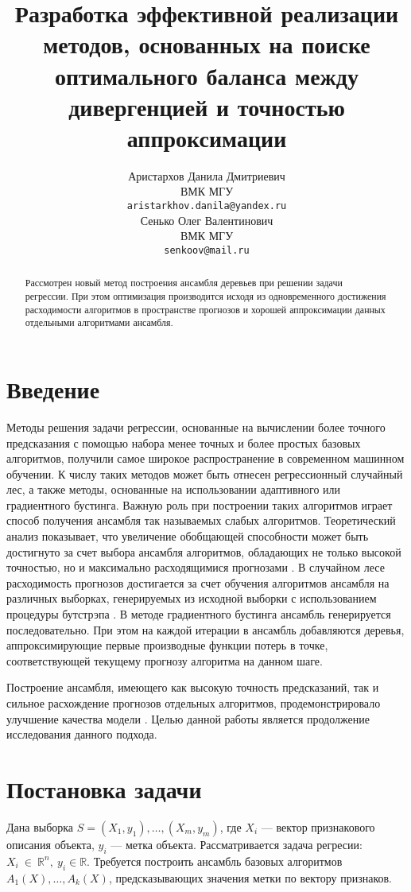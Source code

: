 \documentclass{article}
\title{Разработка эффективной реализации методов, основанных на поиске оптимального баланса между дивергенцией и точностью аппроксимации}
\author{ Аристархов Данила Дмитриевич \\
	ВМК МГУ \\
	\texttt{aristarkhov.danila@yandex.ru} \\
	\And
	Сенько Олег Валентинович \\
	ВМК МГУ \\
	\texttt{senkoov@mail.ru} \\
}
\date{}
\begin{document}
\maketitle

\begin{abstract}
	Рассмотрен новый метод построения ансамбля деревьев при решении задачи регрессии. При этом оптимизация производится исходя из одновременного достижения расходимости алгоритмов в пространстве прогнозов и хорошей аппроксимации данных отдельными алгоритмами ансамбля. 
\end{abstract}



\section{Введение}

Методы решения задачи регрессии, основанные на вычислении более точного предсказания с помощью набора менее точных и более простых базовых алгоритмов, получили самое широкое распространение в современном машинном обучении. К числу таких методов может быть отнесен регрессионный случайный лес, а также методы, основанные на использовании адаптивного или градиентного бустинга. Важную роль при построении таких алгоритмов играет способ получения ансамбля так называемых слабых алгоритмов. Теоретический анализ показывает, что увеличение обобщающей способности может быть достигнуто за счет выбора ансамбля алгоритмов, обладающих не только высокой точностью, но и максимально расходящимися прогнозами \citep{convex}. В случайном лесе расходимость прогнозов достигается за счет обучения алгоритмов ансамбля на различных выборках, генерируемых из исходной выборки с использованием процедуры бутстрэпа \citep{bagging}. В методе градиентного бустинга \citep{boosting} ансамбль генерируется последовательно. При этом на каждой итерации в ансамбль добавляются деревья, аппроксимирующие первые производные функции потерь в точке, соответствующей текущему прогнозу алгоритма на данном шаге.

Построение ансамбля, имеющего как высокую точность предсказаний, так и сильное расхождение прогнозов отдельных алгоритмов, продемонстрировало улучшение качества модели \citep{twolevel}. Целью данной работы является продолжение исследования данного подхода.

\section{Постановка задачи}
Дана выборка $S={(X_1, y_1), \dots, (X_m, y_m)}$, где $X_i$ --- вектор признакового описания объекта, $y_i$ --- метка объекта. Рассматривается задача регресии: $X_i~\in~\mathbb{R}^n, \  y_i \in \mathbb{R}$. Требуется построить ансамбль базовых алгоритмов $A_1(X), \dots, A_k(X)$, предсказывающих значения метки по вектору признаков.
\end{document}
